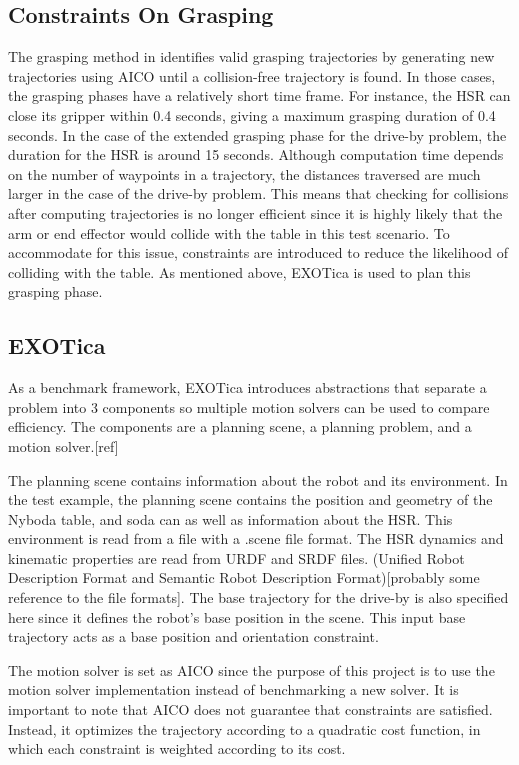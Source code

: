 \documentclass[12pt]{article}
\begin{document}
        \subsection{Constraints On Grasping}
            The grasping method in \cite{yang_planning_2018} identifies valid grasping trajectories by generating new trajectories using AICO until a collision-free trajectory is found. In those cases, the grasping phases have a relatively short time frame. For instance, the HSR can close its gripper within 0.4 seconds, giving a maximum grasping duration of 0.4 seconds. In the case of the extended grasping phase for the drive-by problem, the duration for the HSR is around 15 seconds. Although computation time depends on the number of waypoints in a trajectory, the distances traversed are much larger in the case of the drive-by problem. This means that checking for collisions after computing trajectories is no longer efficient since it is highly likely that the arm or end effector would collide with the table in this test scenario. To accommodate for this issue, constraints are introduced to reduce the likelihood of colliding with the table. As mentioned above, EXOTica is used to plan this grasping phase.

        \subsection{EXOTica}
            As a benchmark framework, EXOTica introduces abstractions that separate a problem into 3 components so multiple motion solvers can be used to compare efficiency.\cite{koubaa_exotica_2019} The components are a planning scene, a planning problem, and a motion solver.[ref]
                
            \par The planning scene contains information about the robot and its environment. In the test example, the planning scene contains the position and geometry of the Nyboda table, and soda can as well as information about the HSR. This environment is read from a file with a .scene file format. The HSR dynamics and kinematic properties are read from URDF and SRDF files. (Unified Robot Description Format and Semantic Robot Description Format)[probably some reference to the file formats]. The base trajectory for the drive-by is also specified here since it defines the robot's base position in the scene. This input base trajectory acts as a base position and orientation constraint.

            \par The motion solver is set as AICO since the purpose of this project is to use the motion solver implementation instead of benchmarking a new solver. It is important to note that AICO does not guarantee that constraints are satisfied. Instead, it optimizes the trajectory according to a quadratic cost function, in which each constraint is weighted according to its cost.
\end{document}
